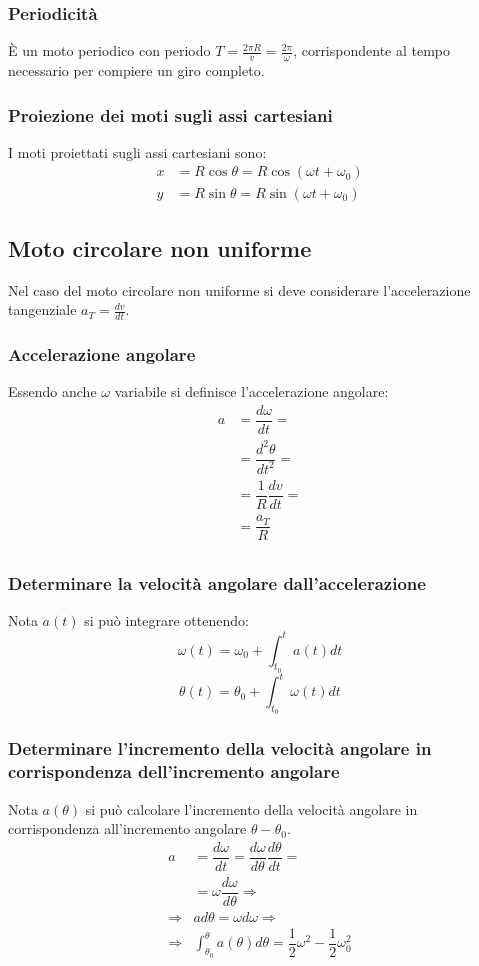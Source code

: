 \documentclass[class=book, crop=false, oneside, 12pt]{standalone}
\begin{document}
    \subsubsection{Periodicit\`a}
    È un moto periodico con periodo \(T = \frac{2 \pi R}{v} = \frac{2 \pi}{\omega}\), corrispondente al tempo necessario per compiere un giro completo.
    \subsubsection{Proiezione dei moti sugli assi cartesiani}
    I moti proiettati sugli assi cartesiani sono:
    \begin{align}
      x&= R \cos \theta = R \cos (\omega t + \omega_0) \\
      y&= R \sin \theta = R \sin (\omega t + \omega_0)
    \end{align}
	\subsection{Moto circolare non uniforme}
	Nel caso del moto circolare non uniforme si deve considerare l'accelerazione tangenziale $a_T=\frac{dv}{dt}$.
		\subsubsection{Accelerazione angolare}
		Essendo anche $\omega$ variabile si definisce l'accelerazione angolare:
		\begin{align*}
			a&=\dfrac{d\omega}{dt}=\\
			 &=\dfrac{d^2\theta}{dt^2}=\\
			 &=\dfrac{1}{R}\dfrac{dv}{dt}=\\
			 &=\dfrac{a_T}{R}\\
		\end{align*}
		\subsubsection{Determinare la velocit\`a angolare dall'accelerazione}
		Nota $a(t)$ si pu\`o integrare ottenendo:
		$$\omega(t)=\omega_0+\int_{t_0}^ta(t)dt$$
		$$\theta(t)=\theta_0+\int_{t_0}^t\omega(t)dt$$
		\subsubsection{Determinare l'incremento della velocit\`a angolare in corrispondenza dell'incremento angolare}
		Nota $a(\theta)$ si pu\`o calcolare l'incremento della velocit\`a angolare in corrispondenza all'incremento angolare $\theta-\theta_0$.
		\begin{align*}
			a&=\dfrac{d\omega}{dt}=\dfrac{d\omega}{d\theta}\dfrac{d\theta}{dt}=\\
			 &=\omega\dfrac{d\omega}{d\theta}\Rightarrow\\
			\Rightarrow&ad\theta=\omega d\omega\Rightarrow\\
			\Rightarrow&\int_{\theta_0}^\theta a(\theta)d\theta=\dfrac{1}{2}\omega^2-\dfrac{1}{2}\omega_0^2
		\end{align*}
\end{document}
